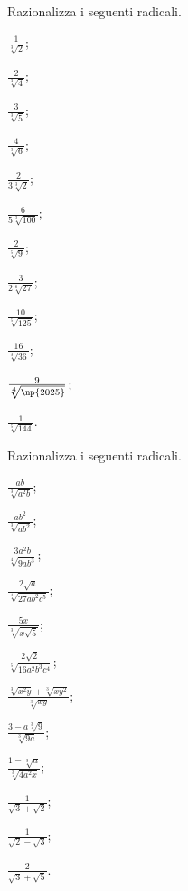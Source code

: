 \begin{esercizio}
 \label{ese:2.88}
Razionalizza i seguenti radicali.
 \begin{multicols}{4}
 \begin{enumeratea}
 \item $\frac 1{\sqrt[3]2}$;
 \item $\frac 2{\sqrt[3]4}$;
 \item $\frac 3{\sqrt[3]5}$;
 \item $\frac 4{\sqrt[3]6}$;
 \item $\frac 2{3\sqrt[3]2}$;
 \item $\frac 6{5\sqrt[3]{100}}$;
 \item $\frac 2{\sqrt[5]9}$;
 \item $\frac 3{2\sqrt[6]{27}}$;
 \item $\frac{10}{\sqrt[5]{125}}$;
 \item $\frac{16}{\sqrt[3]{36}}$;
 \item $\frac 9{\sqrt[4]{\np{2025}}}$;
 \item $\frac 1{\sqrt[5]{144}}$.
 \end{enumeratea}
 \end{multicols}
\end{esercizio}

\begin{esercizio}[\Ast]
 \label{ese:2.89}
Razionalizza i seguenti radicali.
 \begin{multicols}{4}
 \begin{enumeratea}
 \item $\frac{ab}{\sqrt[3]{a^2b}}$;
 \item $\frac{ab^2}{\sqrt[3]{ab^2}}$;
 \item $\frac{3a^2b}{\sqrt[4]{9ab^3}}$;
 \item $\frac{2\sqrt a}{\sqrt[4]{27ab^2c^5}}$;
 \item $\frac{5x}{\sqrt[3]{x\sqrt 5}}$;
 \item $\frac{2\sqrt 2}{\sqrt[5]{16a^2b^3c^4}}$;
 \item $\frac{\sqrt[3]{x^2y}+\sqrt[3]{xy^2}}{\sqrt[3]{xy}}$;
 \item $\frac{3-a\sqrt[3]9}{\sqrt[3]{9a}}$;
 \item $\frac{1-\sqrt[3]a}{\sqrt[3]{4a^2x}}$;
 \item $\frac 1{\sqrt 3+\sqrt 2}$;
 \item $\frac 1{\sqrt 2-\sqrt 3}$;
 \item $\frac 2{\sqrt 3+\sqrt 5}$.
 \end{enumeratea}
 \end{multicols}
\end{esercizio}

